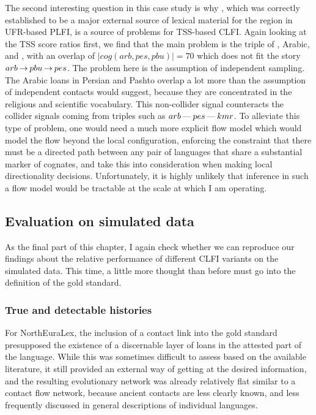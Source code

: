  The second interesting question in this case study is why , which was correctly established to be a major external source of lexical material for the region in UFR-based PLFI, is a source of problems for TSS-based CLFI. Again looking at the TSS score ratios first, we find that the main problem is the triple of , Arabic, and , with an overlap of $|cog(arb,pes,pbu)| = 70$ which does not fit the story $arb \kern 2pt\hbox{$\rightarrow$}\kern 2pt pbu \kern 2pt\hbox{$\rightarrow$}\kern 2pt pes$. The problem here is the assumption of independent sampling. The Arabic loans in Persian and Pashto overlap a lot more than the assumption of independent contacts would suggest, because they are concentrated in the religious and scientific vocabulary. This non-collider signal counteracts the collider signals coming from triples such as $arb \kern 2pt\hbox{---}\kern 2pt pes \kern 2pt\hbox{---}\kern 2pt kmr$. To alleviate this type of problem, one would need a much more explicit flow model which would model the flow beyond the local configuration, enforcing the constraint that there must be a directed path between any pair of languages that share a substantial marker of cognates, and take this into consideration when making local directionality decisions. Unfortunately, it is highly unlikely that inference in such a flow model would be tractable at the scale at which I am operating.

\subsection{Evaluation on simulated data}
As the final part of this chapter, I again check whether we can reproduce our findings about the relative performance of different CLFI variants on the simulated data. This time, a little more thought than before must go into the definition of the gold standard. 

\subsubsection{True and detectable histories}
For NorthEuraLex, the inclusion of a contact link into the gold standard presupposed the existence of a discernable layer of loans in the attested part of the language. While this was sometimes difficult to assess based on the available literature, it still provided an external way of getting at the desired information, and the resulting evolutionary network was already relatively flat similar to a contact flow network, because ancient contacts are less clearly known, and less frequently discussed in general descriptions of individual languages.

